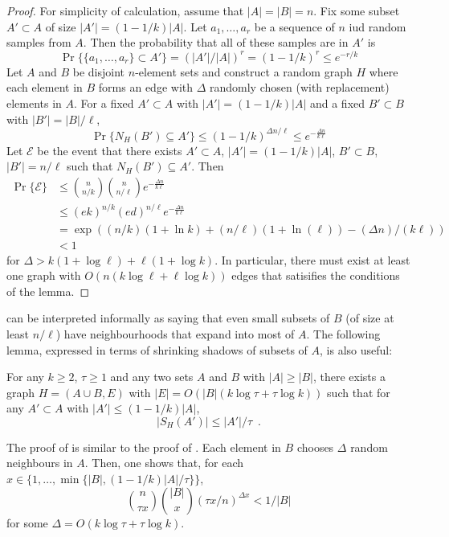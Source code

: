\documentclass{patmorin}
\begin{document}
\begin{proof}
  For simplicity of calculation, assume that $|A|=|B|=n$.  Fix some
  subset $A'\subset A$ of size $|A'|=(1-1/k)|A|$.  Let $a_1,\ldots,a_r$
  be a sequence of $n$ iud random samples from $A$.  Then the probability
  that all of these samples are in $A'$ is
  \[
     \Pr\{\{a_1,\ldots,a_r\}\subset A'\} = (|A'|/|A|)^r = (1-1/k)^r \le e^{-r/k}
  \]
  Let $A$ and $B$ be disjoint $n$-element sets and construct a random
  graph $H$ where each element in $B$ forms an edge with $\Delta$ randomly
  chosen (with replacement) elements in $A$.  For a fixed $A'\subset A$
  with $|A'|=(1-1/k)|A|$ and a fixed $B'\subset B$ with $|B'| = |B|/\ell$,
  \[
    \Pr\{N_H(B') \subseteq A'\} 
        \le (1-1/k)^{\Delta n/\ell} 
        \le e^{-\frac{\Delta n}{k\ell}}
  \]
  Let $\mathcal{E}$ be the event that there exists $A'\subset A$, $|A'|=(1-1/k)|A|$, $B'\subset B$, $|B'|=n/\ell$ such that $N_H(B')\subseteq A'$.  Then
  \begin{align*}
    \Pr\{\mathcal{E}\} 
        & \le \binom{n}{n/k}\binom{n}{n/\ell}e^{-\frac{\Delta n}{k\ell}} \\
        & \le (ek)^{n/k} (ed)^{n/\ell}e^{-\frac{\Delta n}{k\ell}} \\
        & = \exp((n/k)(1+\ln k) + (n/\ell)(1+\ln(\ell)) - (\Delta n)/(k\ell)) \\
        & < 1
  \end{align*}
  for $\Delta > k(1+\log \ell) + \ell(1+\log k)$.  In particular, there
  must exist at least one graph with $O(n(k\log\ell + \ell\log k))$
  edges that satisifies the conditions of the lemma.
\end{proof}

 can be interpreted informally as saying that even small
subsets of $B$ (of size at least $n/\ell$) have neighbourhoods that
expand into most of $A$.  The following lemma, expressed in terms of
shrinking shadows of subsets of $A$, is also useful:

\begin{lem}
   For any $k\ge 2$, $\tau\ge 1$ and any two sets $A$ and $B$ with
   $|A|\ge|B|$, there exists a graph $H=(A\cup B,E)$ with $|E|=O(|B|(k\log
   \tau + \tau\log k))$ such that for any $A'\subset A$ with $|A'|\le
   (1-1/k)|A|$,
   \[ |S_H(A')| \le |A'|/\tau \enspace .\]
\end{lem}

The proof of  is similar to the proof of .
Each element in $B$ chooses $\Delta$ random neighbours in $A$.  Then, one shows that, for each $x\in\{1,\ldots,\min\{|B|, (1-1/k)|A|/\tau\}\}$,
\[
    \binom{n}{\tau x}\binom{|B|}{x}(\tau x/n)^{\Delta x} < 1/|B|
\]
for some $\Delta=O(k\log\tau +\tau\log k)$.
\end{document}

